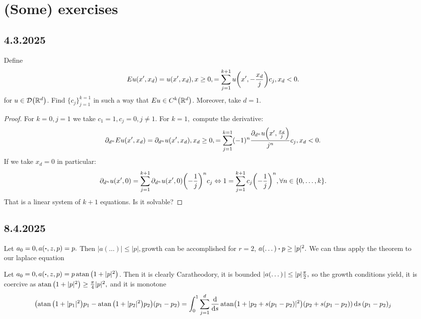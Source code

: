 \documentclass{article}
\begin{document}
\section{(Some) exercises}
\label{sec:exercises}

\subsection{4.3.2025}
\label{sec:43}

\begin{example}
	Define
	\[
		Eu(x',x_d) = u(x',x_d), x \geq 0, = \sum_{j=1}^{k+1}u\qty(x',-\frac{x_d}{j})c_j, x_d<0.
	\]
	for
	$u \in \mathcal{D}\qty({\mathbb R}^d)$. Find $\{c_j\}_{j=1}^{k=1}$ in such a way that $Eu \in C^k\qty({\mathbb R}^d)$. Moreover, take $d=1$.
\end{example}
\begin{proof}
	For $k=0, j=1$ we take $c_1=1, c_j=0, j \neq 1$. For $k=1,$ compute the derivative:
	\[
		\partial_{d^n}E u(x',x_d) = \partial_{d^n}u(x',x_d), x_d \geq 0, =\sum_{j=1}^{k=1}(-1)^n\frac{\partial_{d^n}u\qty(x',\frac{x_d}{j})}{j^n}c_j, x_d <0.
	\]
	If we take $x_d=0$ in particular:
	\[
		\partial_{d^n}u\qty(x',0)= \sum_{j=1}^{k+1}\partial_{d^n}u\qty(x',0)\qty(-\frac{1}{j})^n c_j \Leftrightarrow 1 = \sum_{j=1}^{k+1}c_j \qty(-\frac{1}{j})^n, \forall n \in \{0,\dots,k\}.
	\]
	That is a linear system of $k+1$ equations. Is it solvable?
\end{proof}

\subsection{8.4.2025}
\label{sec:8.4.2025}

\begin{example}[Laplace]
	Let $a_0=0, a\qty(\vdot, z, p) = p.$ Then $|a(\dots)| \leq |p|, $growth can be accomplished for $r=2$, $a(\dots) \vdot p \geq |p|^{2}.$ We can thus apply the theorem to our laplace equation
\end{example}

\begin{example}
	Let $a_0 = 0, a\qty(\vdot, z, p) = p \atan\qty(1+|p|^{2})$. Then it is clearly Caratheodory, it is bounded $|a\qty(\dots)| \leq |p| \frac{\pi}{2},$ so the growth conditions yield, it is coercive as $ \atan\qty(1+|p|^{2})\geq \frac{\pi}{4}|p|^{2},$ and it is monotone
	\[
		\qty(\atan\qty(1+|p_1|^{2})p_1 - \atan\qty(1+|p_2|^{2})p_2)(p_1 - p_2) = \int_0^1 \sum_{j=1}^d\dv{s} \atan(1+|p_2 +s(p_1-p_2)|^{2})(p_2 + s(p_1-p_2))\dd{s} (p_1 - p_2)_j
	\]
\end{example}
\end{document}
